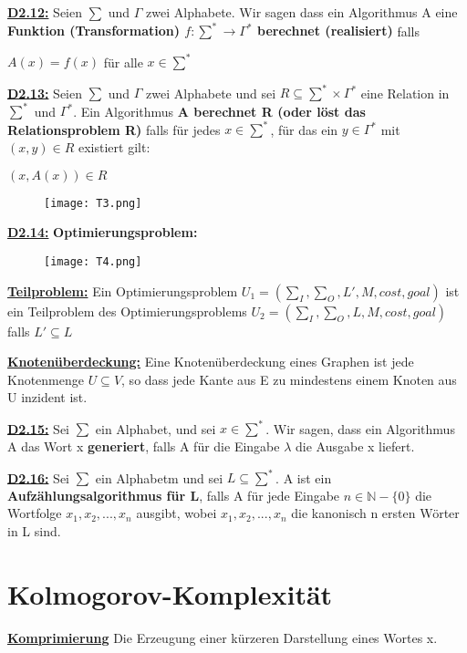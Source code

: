 \documentclass[8pt]{extreport}
\begin{document}
\underline{\textbf{D2.12:}} Seien $\sum$ und $\Gamma$ zwei Alphabete. Wir sagen dass ein Algorithmus A eine \textbf{ Funktion (Transformation) $f: \sum^* \rightarrow \Gamma^*$ berechnet (realisiert)} falls 
\begin{center}
$A(x) = f(x)$ für alle $x\in \sum^*$
\end{center}

\underline{\textbf{D2.13:}} Seien $\sum$ und $\Gamma$ zwei Alphabete und sei $R \subseteq \sum^* \times \Gamma^*$ eine Relation in $\sum^*$ und $\Gamma^*$. Ein Algorithmus \textbf{A berechnet R (oder löst das Relationsproblem R)} falls für jedes $x \in \sum^*$, für das ein $y \in \Gamma^*$ mit $(x,y) \in R$ existiert gilt:
\begin{center}
$(x,A(x)) \in R$
\end{center} 
\begin{figure}[H]
\centering
\texttt{[image: T3.png]}
\end{figure}

\underline{\textbf{D2.14:}} \textbf{Optimierungsproblem:}
\begin{figure}[H]
\centering
\texttt{[image: T4.png]}
\end{figure}

\underline{\textbf{Teilproblem:}} Ein Optimierungsproblem $U_1 = (\sum_I,\sum_O,L',M,cost,goal)$  ist ein Teilproblem des Optimierungsproblems $U_2 =(\sum_I,\sum_O,L,M,cost,goal)$ falls $L'\subseteq L$

\underline{\textbf{Knotenüberdeckung:}} Eine Knotenüberdeckung eines Graphen ist jede Knotenmenge $U \subseteq V$, so dass jede Kante aus E zu mindestens einem Knoten aus U inzident ist.

\underline{\textbf{D2.15:}} Sei $\sum$ ein Alphabet, und sei $x \in \sum^*$. Wir sagen, dass ein Algorithmus A das Wort x \textbf{generiert}, falls A für die Eingabe $\lambda$ die Ausgabe x liefert.

\underline{\textbf{D2.16:}} Sei $\sum$ ein Alphabetm und sei $L \subseteq \sum^*$. A ist ein \textbf{Aufzählungsalgorithmus für L}, falls A für jede Eingabe $n \in \mathbb{N}-\{0\}$ die Wortfolge $x_1,x_2,...,x_n$ ausgibt, wobei $x_1,x_2,...,x_n$ die kanonisch n ersten Wörter in L sind.

\section{Kolmogorov-Komplexität}

\underline{\textbf{Komprimierung}} Die Erzeugung einer kürzeren Darstellung eines Wortes x.
\end{document}
